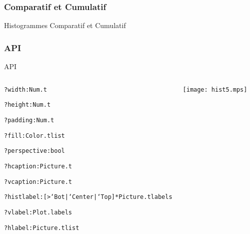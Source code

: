 \documentclass{beamer}
\begin{document}
\subsubsection{Comparatif et Cumulatif}
\begin{frame}{Histogrammes Comparatif et Cumulatif}
\end{frame}


\subsubsection{API}
\begin{frame}{API}
  \begin{columns}
    \begin{center}
      \begin{alltt}
        ?width:Num.t

        ?height:Num.t

        ?padding:Num.t

        ?fill:Color.t list

        ?perspective: bool

        ?hcaption:Picture.t

        ?vcaption:Picture.t

        ?histlabel:[> `Bot | `Center | `Top ] * Picture.t labels

        ?vlabel:Plot.labels

        ?hlabel:Picture.t list 
      \end{alltt}
    \end{center}
    
    \begin{center}
      \texttt{[image: hist5.mps]}
    \end{center}
  \end{columns}
\end{frame}
    
\end{document}
